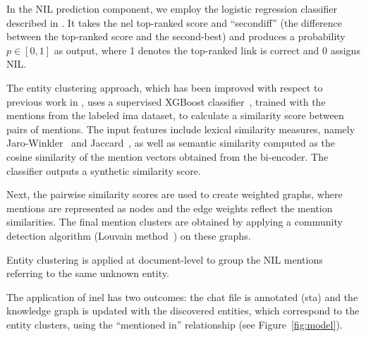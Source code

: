 In the NIL prediction component, we employ the logistic regression classifier described in .
It takes the \ac{nel} top-ranked score and ``secondiff'' (the difference between the top-ranked score and the second-best) and produces a probability $p \in [0,1]$ as output, where 1 denotes the top-ranked link is correct and 0 assigns NIL.



The entity clustering approach, which has been improved with respect to previous work in , uses a supervised XGBoost classifier~\cite{chen2016xgboost}, trained with the mentions from the labeled \ac{ima} dataset, to calculate a similarity score between pairs of mentions. The input features include lexical similarity measures, namely Jaro-Winkler~\cite{winkler1990string} and Jaccard~\cite{jaccard1901etude}, as well as semantic similarity computed as the cosine similarity of the mention vectors obtained from the \blinkita bi-encoder. The classifier outputs a synthetic similarity score.  

Next, the pairwise similarity scores are used to create weighted graphs, where mentions are represented as nodes and the edge weights reflect the mention similarities. The final mention clusters are obtained by applying a community detection algorithm (Louvain method~\cite{blondel2008fast}) on these graphs.

%
Entity clustering is applied at document-level to group the NIL mentions referring to the same unknown entity. %


The application of \ac{inel} has two outcomes: the chat file is annotated (\acl{sta})
and the knowledge graph is updated with the discovered entities, which correspond to the entity clusters, using the ``mentioned in'' relationship (see Figure~\ref{fig:model}).

